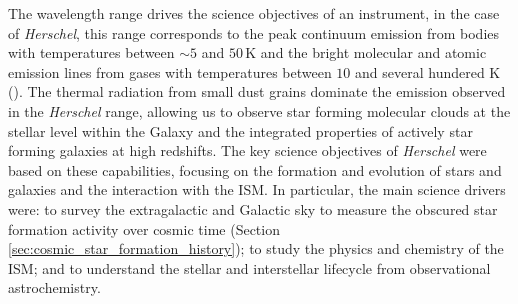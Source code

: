 The wavelength range drives the science objectives of an instrument, in the case of \textit{Herschel}, this range corresponds to the peak continuum emission from bodies with temperatures between $\sim5$ and $50\,$K and the bright molecular and atomic emission lines from gases with temperatures between $10$ and several hundered K (\citealt{Pilbratt_2008}). The thermal radiation from small dust grains dominate the emission observed in the \textit{Herschel} range, allowing us to observe star forming molecular clouds at the stellar level within the Galaxy and the integrated properties of actively star forming galaxies at high redshifts. The key science objectives of \textit{Herschel} were based on these capabilities, focusing on the formation and evolution of stars and galaxies and the interaction with the ISM. In particular, the main science drivers were: to survey the extragalactic and Galactic sky to measure the obscured star formation activity over cosmic time (Section \ref{sec:cosmic_star_formation_history}); to study the physics and chemistry of the ISM; and to understand the stellar and interstellar lifecycle from observational astrochemistry.

